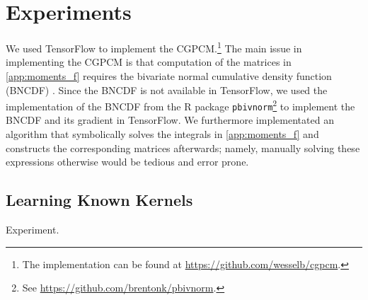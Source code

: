 \documentclass{article}
\newcommand{\id}[1]{\, \mathrm{d} #1}     %
\newcommand{\cond}{\, | \,}               %
\begin{document}
\section{Experiments}
We used TensorFlow \cite{Abadi:2016:TensorFlow_A_System_for_Large-Scale} to implement the CGPCM.\footnote{The implementation can be found at \url{https://github.com/wesselb/cgpcm}.} The main issue in implementing the CGPCM is that computation of the matrices in \cref{app:moments_f} requires the bivariate normal cumulative density function (BNCDF) \cite{Genz:2004:Numerical_Computation_of_Rectangular_Bivariate}. Since the BNCDF is not available in TensorFlow, we used the implementation of the BNCDF from the R package \texttt{pbivnorm}\footnote{See \url{https://github.com/brentonk/pbivnorm}.} to implement the BNCDF and its gradient in TensorFlow. We furthermore implementated an algorithm that symbolically solves the integrals in \cref{app:moments_f} and constructs the corresponding matrices afterwards; namely, manually solving these expressions  otherwise would be tedious and error prone.

\subsection{Learning Known Kernels}

{\color{red} Experiment.}



\end{document}
